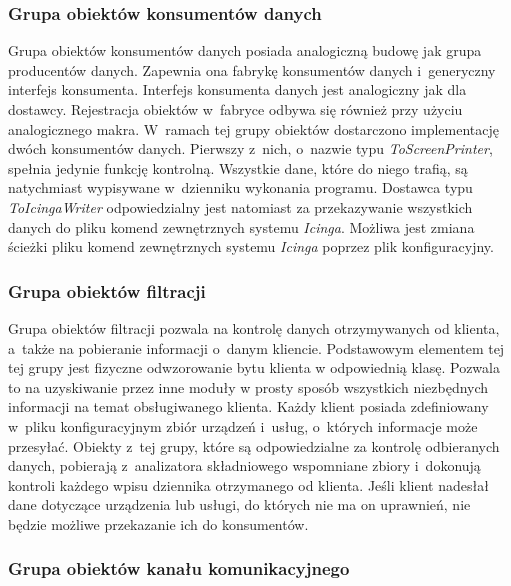 \subsubsection[Grupa obiektów konsumentów danych][Grupa obiektów
konsumentów danych]{Grupa obiektów konsumentów danych}

Grupa obiektów konsumentów danych posiada analogiczną budowę jak grupa
producentów danych. Zapewnia ona fabrykę konsumentów danych
i~generyczny interfejs konsumenta. Interfejs konsumenta danych jest
analogiczny jak dla dostawcy. Rejestracja obiektów w~fabryce odbywa
się również przy użyciu analogicznego makra. W~ramach tej grupy
obiektów dostarczono implementację dwóch konsumentów danych. Pierwszy
z~nich, o~nazwie typu {\em ToScreenPrinter}, spełnia jedynie funkcję
kontrolną. Wszystkie dane, które do niego trafią, są natychmiast
wypisywane w~dzienniku wykonania programu. Dostawca typu {\em
  ToIcingaWriter} odpowiedzialny jest natomiast za przekazywanie
wszystkich danych do pliku komend zewnętrznych systemu {\em Icinga}. Możliwa
jest zmiana ścieżki pliku komend zewnętrznych systemu {\em Icinga} poprzez
plik konfiguracyjny.

\subsubsection[Grupa obiektów filtracji][Grupa obiektów
filtracji]{Grupa obiektów filtracji}

Grupa obiektów filtracji pozwala na kontrolę danych otrzymywanych od
klienta, a~także na pobieranie informacji o~danym
kliencie. Podstawowym elementem tej tej grupy jest fizyczne
odwzorowanie bytu klienta w odpowiednią klasę. Pozwala to na
uzyskiwanie przez inne moduły w prosty sposób wszystkich niezbędnych
informacji na temat obsługiwanego klienta. Każdy klient posiada
zdefiniowany w~pliku konfiguracyjnym zbiór urządzeń i~usług, o~których
informacje może przesyłać. Obiekty z~tej grupy, które są
odpowiedzialne za kontrolę odbieranych danych, pobierają z~analizatora
składniowego wspomniane zbiory i~dokonują kontroli każdego wpisu
dziennika otrzymanego od klienta. Jeśli klient nadesłał dane
dotyczące urządzenia lub usługi, do których nie ma on uprawnień, nie
będzie możliwe przekazanie ich do konsumentów.

\subsubsection[Grupa obiektów kanału komunikacyjnego][Grupa obiektów
kanału komunikacyjnego]{Grupa obiektów kanału komunikacyjnego}

